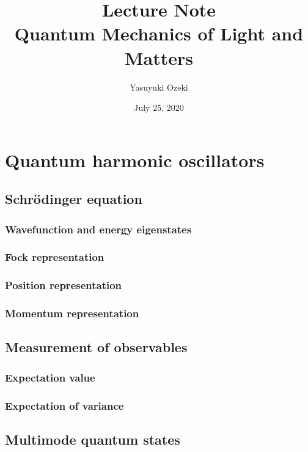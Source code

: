 \documentclass{book}
\begin{document}
\title{Lecture Note \\ Quantum Mechanics of Light and Matters}
\author{Yasuyuki Ozeki}
\date{July 25, 2020}

\maketitle
\tableofcontents
\mainmatter





\chapter{Quantum harmonic oscillators}
\section{Schr\"odinger equation}
\subsection{Wavefunction and energy eigenstates}
\subsection{Fock representation}
\subsection{Position representation}
\subsection{Momentum representation}
\section{Measurement of observables}
\subsection{Expectation value}
\subsection{Expectation of variance}
\section{Multimode quantum states}
\end{document}
